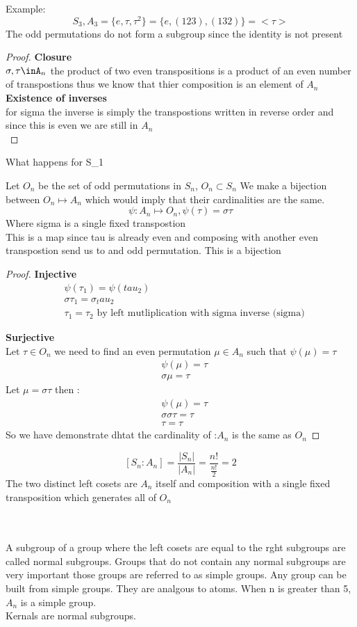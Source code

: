 \documentclass[11pt]{article}
\theoremstyle{definition}  %
\newcommand{\block}[2]{\begin{tcolorbox}[title={#1}]{#2}\end{tcolorbox}}
\begin{document}
Example:
\[
  S_3, A_3=\{e,\tau,\tau^2\}=\{e,(123),(132)\}=<\tau>
\]
The odd permutations do not form a subgroup since the identity is not present\\
\begin{proof}
  \textbf{Closure}\\
  $\sigma,\tau\inA_n$ the product of two even transpositions is a product of an even number of transpostions thus we know that thier composition is an element of $A_n$\\
  \textbf{Existence of inverses}\\
  for sigma the inverse is simply the transpostions written in reverse order and since this is even we are still in $A_n$\\
\end{proof}
What happens for S_1
\block{Proposition: $|A_n|=\frac{n!}{2}$}{
Let $O_n$ be the set of odd permutations in $S_n$, $O_n\subset S_n$ We make a bijection between $O_n\mapsto A_n$ which would imply that their cardinalities are the same. \\
\[
  \psi:A_n\mapsto O_n, \psi(\tau)=\sigma\tau
\]
Where sigma is a single fixed transpostion\\
This is a map since tau is already even and composing with another even transpostion send us to and odd permutation.
This is a bijection
\begin{proof}
  \textbf{Injective}\\
  \begin{align*}
    &\psi(\tau_1)=\psi(tau_2)\\
    &\sigma\tau_1=\sigma_tau_2\\
    &\tau_1=\tau_2 \text{ by left mutliplication with sigma inverse (sigma)}
  \end{align*}

  \textbf{Surjective}\\
  Let $\tau \in O_n$
  we need to find an even permutation $\mu\in A_n$ such that $\psi(\mu)=\tau$\\
  \begin{align*}
    &\psi(\mu)=\tau\\
    &\sigma\mu=\tau
  \end{align*}
  Let $\mu=\sigma\tau$ then :
  \begin{align*}
    &\psi(\mu)=\tau\\
    &\sigma\sigma\tau=\tau\\
    &\tau=\tau
  \end{align*}
So we have demonstrate dhtat the cardinality of :$A_n$ is the same as $O_n$
\end{proof}
}
\block{Corollary}{
\[
  [S_n:A_n]=\frac{|S_n|}{|A_n|}=\frac{n!}{\frac{n!}{2}}=2
\]
The two distinct left cosets are $A_n$ itself and composition with a single fixed transposition which generates all of $O_n$
}\\\\
A subgroup of a group where the left cosets are equal to the rght subgroups are called normal subgroups. Groups that do not contain any normal subgroups are very important those groups are referred to as simple groups. Any group can be built from simple groups. They are analgous to atoms. When n is greater than 5, $A_n$ is a simple group. \\
Kernals are normal subgroups. 
\end{document}

